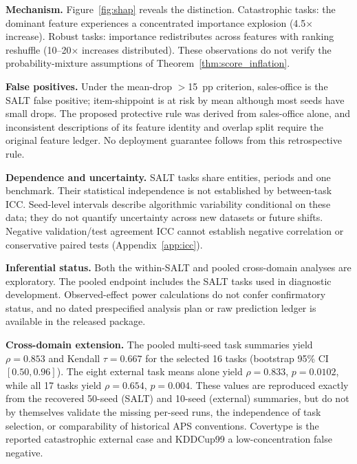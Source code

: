 \documentclass[accepted]{uai2026} %
\begin{document}
\textbf{Mechanism.} Figure~\ref{fig:shap} reveals the distinction. Catastrophic tasks: the dominant feature experiences a concentrated importance explosion (4.5$\times$ increase). Robust tasks: importance redistributes across features with ranking reshuffle (10--20$\times$ increases distributed). These observations do not verify the probability-mixture assumptions of Theorem~\ref{thm:score_inflation}.

\textbf{False positives.} Under the mean-drop $>$15~pp criterion, sales-office is the SALT false positive; item-shippoint is at risk by mean although most seeds have small drops. The proposed protective rule was derived from sales-office alone, and inconsistent descriptions of its feature identity and overlap split require the original feature ledger. No deployment guarantee follows from this retrospective rule.

\textbf{Dependence and uncertainty.} SALT tasks share entities, periods and one benchmark. Their statistical independence is not established by between-task ICC. Seed-level intervals describe algorithmic variability conditional on these data; they do not quantify uncertainty across new datasets or future shifts. Negative validation/test agreement ICC cannot establish negative correlation or conservative paired tests (Appendix~\ref{app:icc}).

\textbf{Inferential status.} Both the within-SALT and pooled cross-domain analyses are exploratory. The pooled endpoint includes the SALT tasks used in diagnostic development. Observed-effect power calculations do not confer confirmatory status, and no dated prespecified analysis plan or raw prediction ledger is available in the released package.

\textbf{Cross-domain extension.} The pooled multi-seed task summaries yield $\rho=0.853$ and Kendall $\tau=0.667$ for the selected 16 tasks (bootstrap 95\% CI $[0.50,0.96]$). The eight external task means alone yield $\rho=0.833$, $p=0.0102$, while all 17 tasks yield $\rho=0.654$, $p=0.004$. These values are reproduced exactly from the recovered 50-seed (SALT) and 10-seed (external) summaries, but do not by themselves validate the missing per-seed runs, the independence of task selection, or comparability of historical APS conventions. Covertype is the reported catastrophic external case and KDDCup99 a low-concentration false negative.
\end{document}
